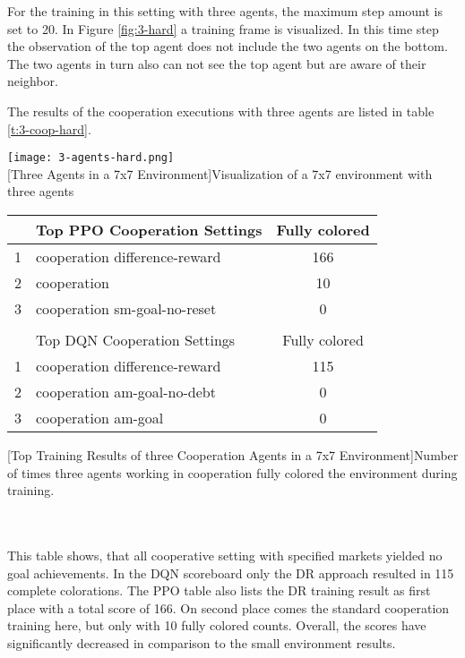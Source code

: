 For the training in this setting with three agents, the maximum step amount is set to 20. In Figure \ref{fig:3-hard} a training frame is visualized. In this time step the observation of the top agent does not include the two agents on the bottom. The two agents in turn also can not see the top agent but are aware of their neighbor. 

The results of the cooperation executions with three agents are listed in table \ref{t:3-coop-hard}. \\

\begin{minipage}{\textwidth}
  \begin{minipage}[b]{0.29\textwidth}
    \centering
    \texttt{[image: 3-agents-hard.png]}\\
    [Three Agents in a 7x7 Environment]{Visualization of a 7x7 environment with three agents}\label{fig:3-hard}
  \end{minipage}
  \hfill
    \begin{minipage}[b]{0.69\textwidth}
    \centering
    \begin{tabular}{clc}\hline
         & Top PPO Cooperation Settings & Fully colored \\ \hline
        {\small1} & cooperation difference-reward & 166 \\
        {\small2} & cooperation & 10 \\
        {\small3} & cooperation sm-goal-no-reset & 0 \\ \hline
         &   \\ \hline
         & Top DQN Cooperation Settings & Fully colored \\ \hline
        {\small 1} & cooperation difference-reward & 115 \\
        {\small 2} & cooperation am-goal-no-debt & 0 \\
        {\small 3} & cooperation am-goal & 0 \\ \hline
        \end{tabular}
        [Top Training Results of three Cooperation Agents in a 7x7 Environment]{Number of times three agents working in cooperation fully colored the environment during training. \\}\label{t:3-coop-hard}
    \end{minipage}
  \end{minipage}\\\\

This table shows, that all cooperative setting with specified markets yielded no goal achievements. In the DQN scoreboard only the DR approach resulted in 115 complete colorations. The PPO table also lists the DR training result as first place with a total score of 166. On second place comes the standard cooperation training here, but only with 10 fully colored counts. Overall, the scores have significantly decreased in comparison to the small environment results.

